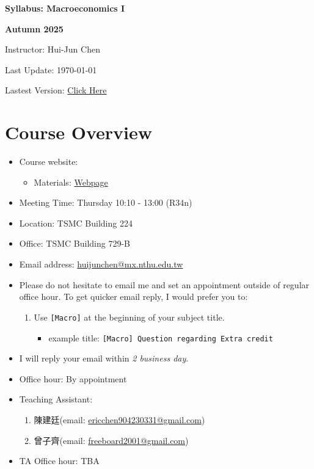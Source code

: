 \documentclass[12pt]{article}
\begin{document}
\centerline{\huge\bf Syllabus: Macroeconomics I}
\medskip
\centerline{\LARGE \bf Autumn 2025}
\medskip
\centerline{\Large Instructor: Hui-Jun Chen}
\centerline{Last Update: \today}
\centerline{Lastest Version: \href{https://huijunchen9260.github.io/pdf/MacroeconomicsIAutumn2025/syllabus/syllabus.pdf}{Click Here}}

\medskip



\section*{Course Overview}
\begin{itemize}

    \item Course website:
    \begin{itemize}
        \item Materials: \href{https://huijunchen9260.github.io/MacroeconomicsIAutumn2025.html}{Webpage}
    \end{itemize}
    \item Meeting Time: Thursday 10:10 - 13:00 (R34n)
    \item Location: TSMC Building 224
    \item Office: TSMC Building 729-B
    \item Email address: \href{huijunchen@mx.nthu.edu.tw}{huijunchen@mx.nthu.edu.tw}
    \item Please do not hesitate to email me and set an appointment outside of regular office hour. To get quicker email reply, I would prefer you to:
    \begin{enumerate}
        \item Use \texttt{[Macro]} at the beginning of your subject title.
        \begin{itemize}
            \item example title: \texttt{[Macro] Question regarding Extra credit}
        \end{itemize}
    \end{enumerate}
    \item I will reply your email within \textit{2 business day}.
    \item Office hour: By appointment
    \item Teaching Assistant:
    \begin{enumerate}
        \item 陳建廷(email: \href{ericchen904230331@gmail.com}{ericchen904230331@gmail.com})
        \item 曾子齊(email: \href{freeboard2001@gmail.com}{freeboard2001@gmail.com})
    \end{enumerate}
    \item TA Office hour: TBA
\end{itemize}
\end{document}
